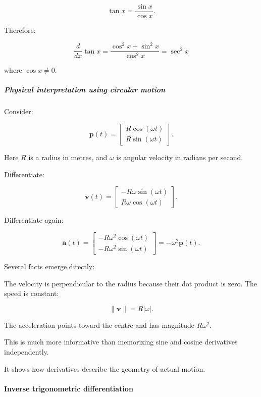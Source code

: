 \[
\tan x=\frac{\sin x}{\cos x}.
\]

Therefore:

\[
\frac d{dx}\tan x = \frac{\cos^2x+\sin^2x}{\cos^2x} = \boxed{\sec^2x}
\]

where \(\cos x\ne0\).

\subparagraph{Physical interpretation using circular motion}\label{01-foundations-i-ch020-physical-interpretation-using-circular-motion}

\hypertarget{01-foundations-i-ch020-physical-interpretation-using-circular-motion}{}

Consider:

\[
\mathbf p(t)= \begin{bmatrix} R\cos(\omega t)\\ R\sin(\omega t) \end{bmatrix}.
\]

Here \(R\) is a radius in metres, and \(\omega\) is angular velocity in radians per second.

Differentiate:

\[
\mathbf v(t)= \begin{bmatrix} -R\omega\sin(\omega t)\\ R\omega\cos(\omega t) \end{bmatrix}.
\]

Differentiate again:

\[
\mathbf a(t)= \begin{bmatrix} -R\omega^2\cos(\omega t)\\ -R\omega^2\sin(\omega t) \end{bmatrix} =-\omega^2\mathbf p(t).
\]

Several facts emerge directly:

The velocity is perpendicular to the radius because their dot product is zero. The speed is constant:

\[
\|\mathbf v\|=R|\omega|.
\]

The acceleration points toward the centre and has magnitude \(R\omega^2\).

This is much more informative than memorizing sine and cosine derivatives independently.

It shows how derivatives describe the geometry of actual motion.

\paragraph{Inverse trigonometric differentiation}\label{01-foundations-i-ch020-inverse-trigonometric-differentiation}

